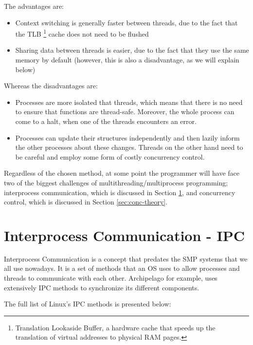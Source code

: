 The advantages are:

\begin{itemize}
	\item Context switching is generally faster between threads, due to the 
		fact that the TLB
		\footnote{Translation Lookaside Buffer, a hardware cache that speeds up 
			the translation of virtual addresses to physical RAΜ pages.}
		cache does not need to be flushed
	\item Sharing data between threads is easier, due to the fact that they use 
		the same memory by default (however, this is also a disadvantage, as we 
		will explain below)
\end{itemize}

Whereas the disadvantages are:

\begin{itemize}
	\item Processes are more isolated that threads, which means that there is 
		no need to ensure that functions are thread-safe. Moreover, the whole 
		process can come to a halt, when one of the threads encounters an 
		error.
	\item Processes can update their structures independently and then lazily 
		inform the other processes about these changes. Threads on the other 
		hand need to be careful and employ some form of costly concurrency 
		control.
\end{itemize}

Regardless of the chosen method, at some point the programmer will have face 
two of the biggest challenges of multithreading/multiprocess programming;
interprocess communication, which is discussed in Section \ref{sec:ipc-theory}, 
and concurrency control, which is discussed in Section \ref{sec:conc-theory}.

\section{Interprocess Communication - IPC}\label{sec:ipc-theory}

Interprocess Communication is a concept that predates the SMP systems that we 
all use nowadays. It is a set of methods that an OS uses to allow processes and 
threads to communicate with each other. Archipelago for example, uses 
extensively IPC methods to synchronize its different components.

The full list of Linux's IPC methods is presented below:

